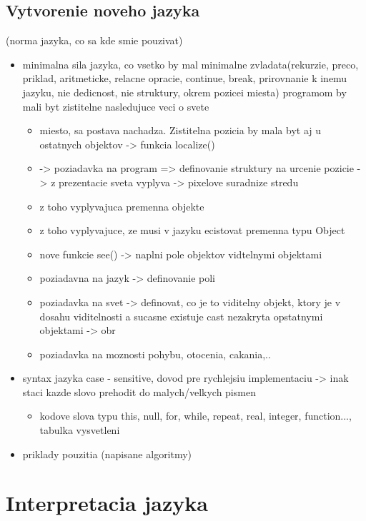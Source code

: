 \documentclass[a4paper,11pt,final]{report}
\begin{document}
\subsection{Vytvorenie noveho jazyka} (norma jazyka, co sa kde smie pouzivat)
\begin{itemize}
\item minimalna sila jazyka, co vsetko by mal minimalne zvladata(rekurzie, preco, priklad, aritmeticke, relacne opracie, continue, break, prirovnanie k inemu jazyku, nie dedicnost, nie struktury, okrem pozicei miesta) programom by mali byt zistitelne nasledujuce veci o svete
\begin{itemize}
\item miesto, sa postava nachadza. Zistitelna pozicia by mala byt aj u ostatnych objektov -> funkcia localize()
\item -> poziadavka na program => definovanie struktury na urcenie pozicie -> z prezentacie sveta vyplyva -> pixelove suradnize stredu
\item z toho vyplyvajuca premenna objekte
\item z toho vyplyvajuce, ze musi v jazyku ecistovat premenna typu Object
\item nove funkcie see() -> naplni pole objektov vidtelnymi objektami
\item poziadavna na jazyk -> definovanie poli
\item poziadavka na svet -> definovat, co je to viditelny objekt, ktory je v dosahu viditelnosti a sucasne existuje cast nezakryta opstatnymi objektami -> obr
\item  poziadavka na moznosti pohybu, otocenia, cakania,..
\end{itemize}
\item syntax jazyka
case - sensitive, dovod pre rychlejsiu implementaciu -> inak staci kazde slovo prehodit do malych/velkych pismen
\begin{itemize}
\item kodove slova typu this, null, for, while, repeat, real, integer, function..., tabulka vysvetleni
\end{itemize}
\item priklady pouzitia (napisane algoritmy)
\end{itemize}
\section {Interpretacia jazyka}
\end{document}
